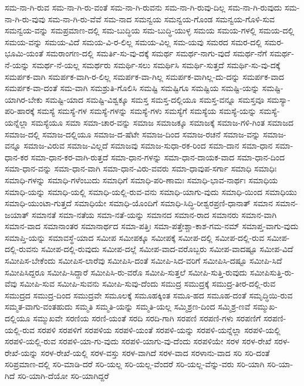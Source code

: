 {ಸಮ-ನಾ-ಗಿ-ರುವ
ಸಮ-ನಾ-ಗಿ-ರು-ವಂತೆ
ಸಮ-ನಾ-ಗಿ-ರುವನು
ಸಮ-ನಾ-ಗಿ-ರುವು-ದಿಲ್ಲ
ಸಮ-ನಾ-ಗಿ-ರುವುದು
ಸಮ-ನಾ-ಗಿ-ರು-ವುವು
ಸಮ-ನಾ-ಗಿ-ರು-ವೆವೆ
ಸಮ-ನಾದ
ಸಮನ್ವಯ
ಸಮನ್ವಯ-ಗೊಂಡ
ಸಮನ್ವಯ-ಗೊಳಿ-ಸುವ
ಸಮನ್ವಯ-ವನ್ನು
ಸಮಪ್ರಮಾಣ-ದಲ್ಲಿ
ಸಮ-ಬುದ್ಧಿಯ
ಸಮ-ಬುದ್ಧಿ-ಯುಳ್ಳ
ಸಮಯ
ಸಮಯ-ಗಳಲ್ಲಿ
ಸಮಯ-ದಲ್ಲಿ
ಸಮಯ-ವನ್ನು
ಸಮಯ-ವಿದೆ
ಸಮಯ-ವಿ-ರ-ಲಿಲ್ಲ
ಸಮಯ-ವಿಲ್ಲ
ಸಮ-ಯವು
ಸಮರದ
ಸಮರ-ದಲ್ಲಿ
ಸಮರ-ಭೂಮಿ-ಯಂತೆ
ಸಮರಾಂಗಣ-ದಲ್ಲಿ
ಸಮರ್ತಿ-ಸು-ವು-ದಕ್ಕೆ
ಸಮರ್ಥ
ಸಮರ್ಥ-ನಾಗು-ವುದೆ
ಸಮರ್ಥ-ನೆಗೆ
ಸಮರ್ಥ-ನೆ-ಯನ್ನು
ಸಮರ್ಥ-ನೆ-ಯಲ್ಲ
ಸಮರ್ಥರು
ಸಮರ್ಥಿ-ಸಲು
ಸಮರ್ಥಿಸಿ
ಸಮರ್ಥಿ-ಸುತ್ತದೆ
ಸಮರ್ಥಿ-ಸು-ವು-ದಕ್ಕೆ
ಸಮರ್ಪಕ-ವಾಗಿ
ಸಮರ್ಪಕ-ವಾಗಿ-ರ-ಲಿಲ್ಲ
ಸಮರ್ಪಕ-ವಾ-ಗಿಲ್ಲ
ಸಮರ್ಪಕ-ವಾಗಿಲ್ಲ-ದು-ದನ್ನು
ಸಮರ್ಪಕ-ವಾದ
ಸಮರ್ಪಕ-ವಾ-ದಂತೆ
ಸಮ-ವಾಗಿ
ಸಮಶ್ರುತಿ-ಗೊಲಿಸಿ
ಸಮಷ್ಟಿ
ಸಮಷ್ಟಿಗೂ
ಸಮಷ್ಟಿಯ
ಸಮಷ್ಟಿ-ಯನ್ನು
ಸಮಷ್ಟಿ-ಯಾಗಿರ-ಬೇಕು
ಸಮಷ್ಟಿ-ಯಾದ
ಸಮಷ್ಟಿ-ವಿಶ್ವಕ್ಕೂ
ಸಮಸ್ತ
ಸಮಸ್ತ-ದಲ್ಲಿಯೂ
ಸಮಸ್ತ-ವನ್ನೂ
ಸಮಸ್ತವೂ
ಸಮಸ್ಯಾ-ಪರಿ-ಹಾರಕ್ಕೆ
ಸಮಸ್ಯೆ
ಸಮಸ್ಯೆ-ಗಳ
ಸಮಸ್ಯೆ-ಗಳನ್ನು
ಸಮಸ್ಯೆ-ಗಳು
ಸಮಸ್ಯೆಗೆ
ಸಮಸ್ಯೆಯ
ಸಮಸ್ಯೆ-ಯನ್ನು
ಸಮಸ್ಯೆ-ಯನ್ನೆಲ್ಲಾ
ಸಮಸ್ಯೆಯೂ
ಸಮಾ
ಸಮಾ-ಚಾರ-ವನ್ನು
ಸಮಾಜ
ಸಮಾಜಕ್ಕೂ
ಸಮಾಜಕ್ಕೆ
ಸಮಾಜ-ಗಳಿ-ಗಿಂತ
ಸಮಾಜದ
ಸಮಾಜ-ದಲ್ಲಿ
ಸಮಾಜ-ದಲ್ಲಿಯೂ
ಸಮಾಜ-ದ-ಷೆಟೇ
ಸಮಾಜ-ದಿಂದ
ಸಮಾಜ-ರಚನೆ
ಸಮಾಜ-ವನ್ನು
ಸಮಾಜ-ವನ್ನೂ
ಸಮಾಜ-ವಿರುವ
ಸಮಾಜ-ವಿಲ್ಲದೆ
ಸಮಾಜವು
ಸಮಾಜ-ಸುಧಾ-ರಕ-ರಿಂದ
ಸಮಾ-ದಾನ
ಸಮಾ-ಧಾನ
ಸಮಾ-ಧಾನ-ಕರ
ಸಮಾ-ಧಾನ-ಕರ-ವಾಗಿ-ರುತ್ತದೆ
ಸಮಾ-ಧಾನ-ಗಳನ್ನು
ಸಮಾ-ಧಾನ-ದಾಯಕ-ವಾದ
ಸಮಾ-ಧಾನ-ದಿಂದ
ಸಮಾ-ಧಾನ-ವನ್ನು
ಸಮಾ-ಧಾನ-ವಾಗಿ
ಸಮಾ-ಧಾನ-ವಿರು-ವವರು
ಸಮಾ-ಧಾವುಪ-ಸರ್ಗಾ
ಸಮಾಧಿ
ಸಮಾಧಿಃ
ಸಮಾಧಿ-ಗಳನ್ನು
ಸಮಾಧಿ-ಗಳೆಂಬುದು
ಸಮಾಧಿಗೆ
ಸಮಾಧಿ-ಪರಿ-ಣಾಮಃ
ಸಮಾಧಿ-ಭಾವ-ನಾರ್ಥಃ
ಸಮಾಧಿಯ
ಸಮಾಧಿ-ಯನ್ನು
ಸಮಾಧಿ-ಯಲ್ಲಿ
ಸಮಾಧಿ-ಯಲ್ಲಿ-ರುವ-ವನು
ಸಮಾಧಿ-ಯಾಗು-ವುದು
ಸಮಾಧಿ-ಯಿಂದ
ಸಮಾಧಿಯು
ಸಮಾಧಿ-ಯುಂಟಾ-ಗುತ್ತದೆ
ಸಮಾಧಿಯೇ
ಸಮಾಧಿ-ಯೊಂದಿಗೆ
ಸಮಾಧಿ-ಸಿದ್ಧಿ-ರೀಶ್ವರಪ್ರಣಿ-ಧಾನಾತ್
ಸಮಾನ
ಸಮಾನ-ಜಯಾತ್
ಸಮಾನತೆ
ಸಮಾ-ನತೆಯ
ಸಮಾ-ನತೆ-ಯನ್ನು
ಸಮಾನದ
ಸಮಾನ-ರಾದ
ಸಮಾನರು
ಸಮಾನ-ವಾಗಿ
ಸಮಾನ-ವಾದ
ಸಮಾನಾಂತರ
ಸಮಾನಾರ್ಥದ
ಸಮಾ-ಪತ್ತಿಃ
ಸಮಾ-ಪತ್ತೇಶ್ಚಾ-ಕಾಶ-ಗಮ-ನಮ್
ಸಮಾಪ್ತ-ವಾಗು-ವುದು
ಸಮಾಪ್ತಿ-ಯನ್ನು
ಸಮಾವಸ್ಥೆ-ಯಾದ
ಸಮೀಪ
ಸಮೀಪಕ್ಕೂ
ಸಮೀಪಕ್ಕೆ
ಸಮೀಪ-ದಲ್ಲಿ
ಸಮೀಪ-ದಲ್ಲಿ-ರುವ
ಸಮೀಪ-ದಲ್ಲಿ-ರುವನು
ಸಮೀಪ-ದಲ್ಲಿ-ರುವುದು
ಸಮೀಪ-ದಲ್ಲೆ
ಸಮೀಪ-ವಾದ-ವರೊಬ್ಬರು
ಸಮೀಪ-ವಾದಷ್ಟೂ
ಸಮೀಪ-ವಿದೆ
ಸಮೀಪಿಸ-ಬೇಕೆಂದು
ಸಮೀಪಿಸ-ಲಾರೆವು
ಸಮೀಪಿಸಿ-ದಂತೆ
ಸಮೀಪಿ-ಸಿದ-ವರಿಗೆ
ಸಮೀಪಿಸಿ-ದಷ್ಟೂ
ಸಮೀಪಿ-ಸಿದೆ
ಸಮೀಪಿಸಿದ್ದರೂ
ಸಮೀಪಿ-ಸಿದ್ದಾರೆ
ಸಮೀಪಿಸಿ-ರು-ವರೊ
ಸಮೀಪಿ-ಸುತ್ತಲೆ
ಸಮೀಪಿ-ಸುತ್ತಿ-ರುವುದು
ಸಮೀಪಿಸುತ್ತಿ-ರು-ವೆವು
ಸಮೀಪಿ-ಸುವ
ಸಮೀಪಿ-ಸುವನು
ಸಮೀಪಿ-ಸುವು-ದೆಂದು
ಸಮುದ್ರ
ಸಮುದ್ರಕ್ಕೆ
ಸಮುದ್ರ-ತೀರ-ದಲ್ಲಿ-ರುವ
ಸಮುದ್ರದ
ಸಮುದ್ರ-ದಿಂದ
ಸಮುದ್ರವೇ
ಸಮೂಲಕ್ಕೆ
ಸಮೂಹಕ್ಕಿಂತ
ಸಮೂ-ಹದ
ಸಮೂಹ-ದಂತೆ
ಸಮೃದ್ಧಿಯಿ-ರುವ
ಸಮ್ಮತ-ವಾಗು-ವಂತಹುದು
ಸಮ್ಮತಿ
ಸಮ್ಮತಿ-ಯನ್ನು
ಸಮ್ಮತಿ-ಯಲ್ಲ
ಸಮ್ಮಿಶ್ರಣ-ದಿಂದ
ಸಮ್ಮಿಶ್ರ-ಣವೆ
ಸಮ್ಮುಖ-ದಲ್ಲಿಯೂ
ಸಮ್ಮುಖವೇ
ಸರಣಿಯ
ಸರಣಿ-ಯಂತೆ
ಸರದಿ
ಸರದಿ-ಗಾಗಿ
ಸರಪಣಿ
ಸರಪಣಿ-ಗಳು
ಸರಪಣಿಗೆ
ಸರಪಣಿ-ಯಲ್ಲಿ-ರುವ
ಸರಪಳಿ
ಸರಪಳಿಗೆ
ಸರಪಳಿಯ
ಸರಪಳಿ-ಯಂತೆ
ಸರಪಳಿ-ಯನ್ನು
ಸರಪಳಿ-ಯನ್ನೆಲ್ಲಾ
ಸರಪಳಿ-ಯಲ್ಲಿ
ಸರಪಳಿ-ಯಲ್ಲಿ-ರುವ
ಸರಪಳಿ-ಯಾ-ಗು-ವುದು
ಸರಪಳಿ-ಯಾಗು-ವು-ದೆಂದು
ಸರಪಳಿಯೇ
ಸರಳ
ಸರಳ-ರೇಖೆ
ಸರಳ-ರೇಖೆ-ಯನ್ನು
ಸರಳ-ರೇಖೆ-ಯಲ್ಲಿ
ಸರಳ-ವಸ್ತು
ಸರಳ-ವಾಗಿದೆ
ಸರಳ-ವಾದ
ಸರಳಾನು-ವಾದ
ಸರಿ
ಸರಿ-ದಂತೆ
ಸರಿಪ್ರಮಾಣ-ದಲ್ಲಿ
ಸರಿ-ಮಾಡಿ-ದರೆ
ಸರಿ-ಯಲ್ಲ
ಸರಿ-ಯಲ್ಲ-ವೆಂದರೆ
ಸರಿ-ಯಲ್ಲ-ವೆನ್ನು-ವರು
ಸರಿ-ಯಾಗಿ
ಸರಿ-ಯಾ-ಗಿದೆ
ಸರಿ-ಯಾಗಿ-ದೆಯೋ
ಸರಿ-ಯಾಗಿದ್ದರೆ
}

